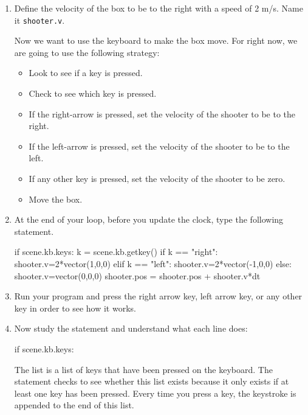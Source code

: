 \begin{enumerate}
	\item Define the velocity of the box to be to the right with a speed of 2 m/s. Name it \texttt{shooter.v}.
	

Now we want to use the keyboard to make the box move. For right now, we are going to use the following strategy:

\begin{itemize}
	\item Look to see if a key is pressed.
	\item Check to see which key is pressed.
	\item If the right-arrow is pressed, set the velocity of the shooter to be to the right.
	\item If the left-arrow is pressed, set the velocity of the shooter to be to the left.
	\item If any other key is pressed, set the velocity of the shooter to be zero.
	\item Move the box.
\end{itemize}

	\item At the end of your  loop, before you update the clock, type the following  statement.
	
\begin{myvpython}
    if scene.kb.keys:
            k = scene.kb.getkey()
            if k == "right":
                shooter.v=2*vector(1,0,0)
            elif k == "left":
                shooter.v=2*vector(-1,0,0)
            else:
                shooter.v=vector(0,0,0)
    shooter.pos = shooter.pos + shooter.v*dt
\end{myvpython}

	\item Run your program and press the right arrow key, left arrow key, or any other key in order to see how it works.
	
	\item Now study the  statement and understand what each line does:

\begin{myvpython}
    if scene.kb.keys: 
\end{myvpython}
	
	The list  is a list of keys that have been pressed on the keyboard. The  statement checks to see whether this list exists because it only exists if at least one key has been pressed. Every time you press a key, the keystroke is appended to the end of this list.
	

\end{enumerate}
